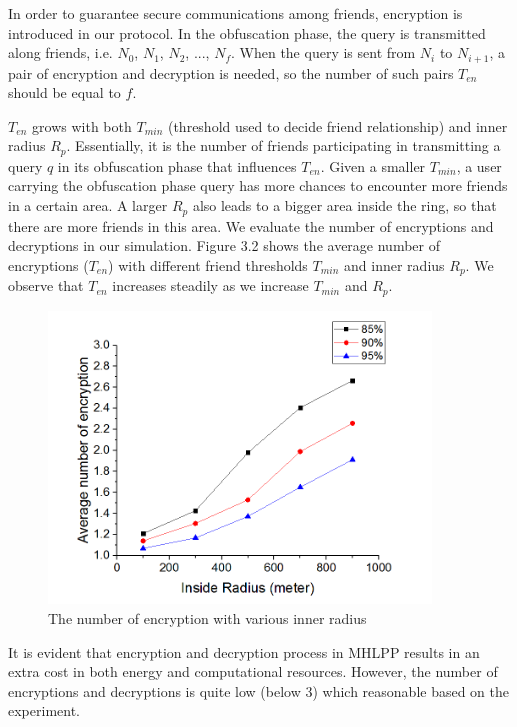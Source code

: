\noindent In order to guarantee secure communications among friends, encryption is introduced in our protocol. In the obfuscation phase, the query is transmitted along friends, i.e. ${N}_{0}$, ${N}_{1}$, ${N}_{2}$, ..., ${N}_{f}$. When the query is sent from ${N}_{i}$ to ${N}_{i+1}$, a pair of encryption and decryption is needed, so the number of such pairs $T_{en}$ should be equal to $f$. 

$T_{en}$ grows with both ${T}_{min}$ (threshold used to decide friend relationship) and inner radius ${R}_{p}$. Essentially, it is the number of friends participating in transmitting a query $q$ in its obfuscation phase that influences $T_{en}$. Given a smaller ${T}_{min}$, a user carrying the obfuscation phase query has more chances to encounter more friends in a certain area. A larger ${R}_{p}$ also leads to a bigger area inside the ring, so that there are more friends in this area. We evaluate the number of encryptions and decryptions in our simulation. Figure 3.2 shows the average number of encryptions ($T_{en}$) with different friend thresholds ${T}_{min}$ and inner radius ${R}_{p}$. We observe that $T_{en}$ increases steadily as we increase ${T}_{min}$ and ${R}_{p}$.

\begin{figure} [H]
  \centering 
  \includegraphics[width=4.0in]{figures/NumOfEncWithInnerR.png}
  \caption{The number of encryption with various inner radius} 
  \label{fig:NumOfEncWithInnerR} %
\end{figure}

It is evident that encryption and decryption process in MHLPP results in an extra cost in both energy and computational resources. However, the number of encryptions and decryptions is quite low (below 3) which reasonable based on the experiment.

